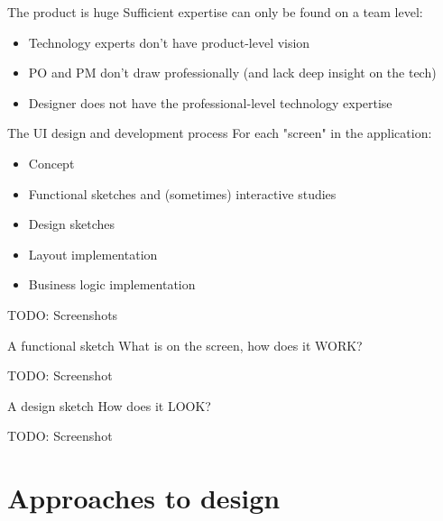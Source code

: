 \documentclass[aspectratio=43,handout,bigger]{beamer}
\begin{document}
\begin{frame}{The product is huge}
  Sufficient expertise can only be found on a team level:

  \begin{itemize}
    \item Technology experts don't have product-level vision
    \item PO and PM don't draw professionally
          (and lack deep insight on the tech)
    \item Designer does not have the professional-level technology expertise
  \end{itemize}
\end{frame}


\begin{frame}{The UI design and development process}
  For each "screen" in the application:

  \begin{itemize}
    \item Concept
    \item Functional sketches and (sometimes) interactive studies
    \item Design sketches
    \item Layout implementation
    \item Business logic implementation
  \end{itemize}

  TODO: Screenshots
\end{frame}


\begin{frame}{A functional sketch}
  What is on the screen, how does it WORK?

  TODO: Screenshot
\end{frame}


\begin{frame}{A design sketch}
  How does it LOOK?

  TODO: Screenshot
\end{frame}

\section{Approaches to design}
\end{document}
